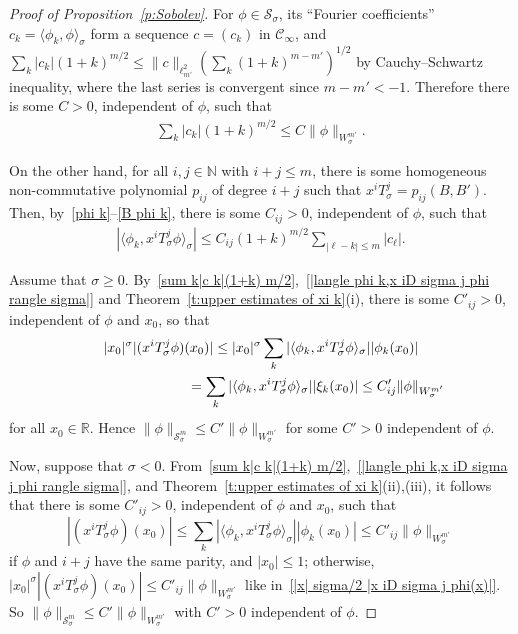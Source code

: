\documentclass[pdftex]{sigma}
\newcommand{\R}{\mathbb{R}}
\newcommand{\N}{\mathbb{N}}
\newcommand{\CC}{\mathcal{C}}
\renewcommand{\SS}{\mathcal{S}}
\begin{document}
\begin{proof}[Proof of Proposition~\ref{p:Sobolev}]
  For $\phi\in\SS_\sigma$, its ``Fourier coef\/f\/icients'' $c_k=\langle\phi_k,\phi\rangle_\sigma$ form a sequence $c=(c_k)$ in $\CC_\infty$, and $\sum_k|c_k| (1+k)^{m/2}\le\|c\|_{\ell^2_{m'}}(\sum_k(1+k)^{m-m'})^{1/2}$ by Cauchy--Schwartz inequality, where the last series is convergent since $m-m'<-1$. Therefore there is some $C>0$, independent of $\phi$, such that
    \begin{gather}\label{sum k|c k|(1+k) m/2}
      \sum_k|c_k| (1+k)^{m/2}\le C \|\phi\|_{W_\sigma^{m'}} .
    \end{gather}

  On the other hand, for all $i,j\in\N$ with $i+j\le m$, there is some homogeneous non-commutative polynomial $p_{ij}$ of degree $i+j$ such that $x^iT_\sigma^j=p_{ij}(B,B')$. Then, by~\eqref{phi k}--\eqref{B phi k}, there is some $C_{ij}>0$, independent of $\phi$, such that
    \begin{gather}\label{|langle phi k,x iD sigma j phi rangle sigma|}
      |\langle\phi_k,x^iT_\sigma^j\phi\rangle_\sigma|\le C_{ij}(1+k)^{m/2}\sum_{|\ell-k|\le m}|c_\ell| .
    \end{gather}

 Assume that $\sigma\ge0$. By~\eqref{sum k|c k|(1+k) m/2},~\eqref{|langle phi k,x iD sigma j phi rangle sigma|} and Theorem~\ref{t:upper estimates of xi k}(i), there is some $C'_{ij}>0$, independent of $\phi$ and $x_0$, so that
    \begin{gather}
      |x_0|^\sigma |(x^iT_\sigma^j\phi)(x_0)|\le |x_0|^\sigma\sum_k|\langle\phi_k,x^iT_\sigma^j\phi\rangle_\sigma| |\phi_k(x_0)|\nonumber\\
 \hphantom{|x_0|^\sigma |(x^iT_\sigma^j\phi)(x_0)|}{}
      =\sum_k|\langle\phi_k,x^iT_\sigma^j\phi\rangle_\sigma| |\xi_k(x_0)|\le C'_{ij} \|\phi\|_{W_\sigma^{m'}}\label{|x| sigma/2 |x iD sigma j phi(x)|}
    \end{gather}
  for all $x_0\in\R$. Hence $\|\phi\|_{\SS_\sigma^m}\le C'\|\phi\|_{W_\sigma^{m'}}$ for some $C'>0$ independent of $\phi$.

  Now, suppose that  $\sigma<0$. From~\eqref{sum k|c k|(1+k) m/2},~\eqref{|langle phi k,x iD sigma j phi rangle sigma|}, and Theorem~\ref{t:upper estimates of xi k}(ii),(iii), it follows that there is some $C'_{ij}>0$, independent of $\phi$ and $x_0$, such that
    \[
      |(x^iT_\sigma^j\phi)(x_0)|\le\sum_k|\langle\phi_k,x^iT_\sigma^j\phi\rangle_\sigma| |\phi_k(x_0)|
      \le C'_{ij} \|\phi\|_{W_\sigma^{m'}}
    \]
  if $\phi$ and $i+j$ have the same parity, and $|x_0|\le1$; otherwise, $|x_0|^\sigma |(x^iT_\sigma^j\phi)(x_0)|\le C'_{ij} \|\phi\|_{W_\sigma^{m'}}$ like in~\eqref{|x| sigma/2 |x iD sigma j phi(x)|}. So $\|\phi\|_{\SS_ \sigma ^m}\le C'\|\phi\|_{W_\sigma^{m'}}$ with $C'>0$ independent of $\phi$.
\end{proof}
\end{document}
